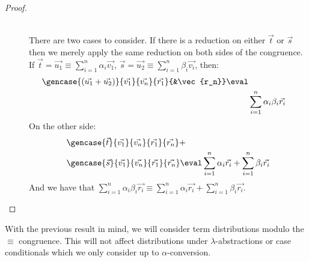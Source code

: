 \begin{proof}
\begin{description}
  \item[\parbox{\linewidth}{$\gencase{(\vec{t}+\vec{s})}{\vec{v}}{\vec{w}}{\vec{r_1}}{\vec{r_n}}\equiv\\ \gencase{\vec{t}}{\vec{v_1}}{\vec{v_n}}{\vec{r_1}}{\vec{r_n}}+\\
  \gencase{\vec{s}}{\vec{v_1}}{\vec{v_n}}{\vec{r_1}}{\vec{r_n}}$:}] \hfill\\
  
  There are two cases to consider. If there is a reduction on either $\vec{t}$ or $\vec{s}$ then we merely apply the same reduction on both sides of the congruence. If $\vec{t}=\vec{u_1}\equiv \sum_{i=1}^{n}\alpha_i \vec{v_1}$, $\vec{s}=\vec{u_2}\equiv\sum_{i=1}^{n}\beta_i \vec{v_i}$, then:
  \begin{align*}
  \gencase{(\vec{u_1}+\vec{u_2})}{\vec{v_1}}{\vec{v_n}}{\vec{r_1}}{&\vec{r_n}}\eval\\
  &\sum_{i=1}^{n} \alpha_i \beta_i \vec{r_i}
  \end{align*}
  On the other side:
  \begin{align*}
    &\gencase{\vec{t}}{\vec{v_1}}{\vec{v_n}}{\vec{r_1}}{\vec{r_n}}+\\
    &\gencase{\vec{s}}{\vec{v_1}}{\vec{v_n}}{\vec{r_1}}{\vec{r_n}}\eval\sum_{i=1}^{n}\alpha_i\vec{r_i} + \sum_{i=1}^{n}\beta_i \vec{r_i}
  \end{align*}
  And we have that $\sum_{i=1}^{n} \alpha_i\beta_i\vec{r_i}\equiv\sum_{i=1}^{n}\alpha_i\vec{r_i} + \sum_{i=1}^{n}\beta_i \vec{r_i}$.
  \end{description}
\end{proof}

\begin{convention}
  With the previous result in mind, we will consider term distributions modulo the $\equiv$ congruence. This will not affect distributions under $\lambda$-abstractions or case conditionals which we only consider up to $\alpha$-conversion.
\end{convention}
